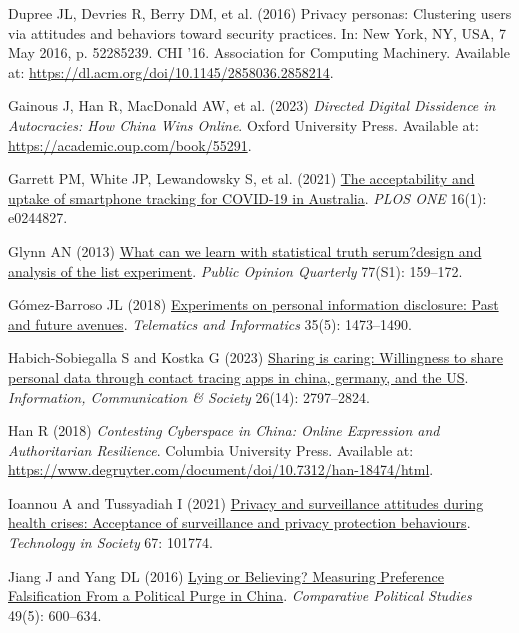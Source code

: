 \documentclass[
  letterpaper,
  DIV=11,
  numbers=noendperiod]{scrartcl}
\newlength{\cslhangindent}
\newenvironment{CSLReferences}[2] %
 {\begin{list}{}{%
  \setlength{\itemindent}{0pt}
  \setlength{\leftmargin}{0pt}
  \setlength{\parsep}{0pt}
  \ifodd #1
   \setlength{\leftmargin}{\cslhangindent}
   \setlength{\itemindent}{-1\cslhangindent}
  \fi
  \setlength{\itemsep}{#2\baselineskip}}}
 {\end{list}}
\begin{document}
\begin{CSLReferences}{1}{1}
Dupree JL, Devries R, Berry DM, et al. (2016) Privacy personas:
Clustering users via attitudes and behaviors toward security practices.
In: New York, NY, USA, 7 May 2016, p. 52285239. CHI '16. Association for
Computing Machinery. Available at:
\url{https://dl.acm.org/doi/10.1145/2858036.2858214}.

Gainous J, Han R, MacDonald AW, et al. (2023) \emph{Directed Digital
Dissidence in Autocracies: How China Wins Online}. Oxford University
Press. Available at: \url{https://academic.oup.com/book/55291}.

Garrett PM, White JP, Lewandowsky S, et al. (2021)
\href{https://doi.org/10.1371/journal.pone.0244827}{The acceptability
and uptake of smartphone tracking for COVID-19 in Australia}. \emph{PLOS
ONE} 16(1): e0244827.

Glynn AN (2013) \href{https://doi.org/10.1093/poq/nfs070}{What can we
learn with statistical truth serum?design and analysis of the list
experiment}. \emph{Public Opinion Quarterly} 77(S1): 159--172.

Gómez-Barroso JL (2018)
\href{https://doi.org/10.1016/j.tele.2018.03.017}{Experiments on
personal information disclosure: Past and future avenues}.
\emph{Telematics and Informatics} 35(5): 1473--1490.

Habich-Sobiegalla S and Kostka G (2023)
\href{https://doi.org/10.1080/1369118X.2022.2113421}{Sharing is caring:
Willingness to share personal data through contact tracing apps in
china, germany, and the US}. \emph{Information, Communication \&
Society} 26(14): 2797--2824.

Han R (2018) \emph{Contesting Cyberspace in China: Online Expression and
Authoritarian Resilience}. Columbia University Press. Available at:
\url{https://www.degruyter.com/document/doi/10.7312/han-18474/html}.

Ioannou A and Tussyadiah I (2021)
\href{https://doi.org/10.1016/j.techsoc.2021.101774}{Privacy and
surveillance attitudes during health crises: Acceptance of surveillance
and privacy protection behaviours}. \emph{Technology in Society} 67:
101774.

Jiang J and Yang DL (2016)
\href{https://doi.org/10.1177/0010414015626450}{Lying or Believing?
Measuring Preference Falsification From a Political Purge in China}.
\emph{Comparative Political Studies} 49(5): 600--634.


\end{CSLReferences}
\end{document}
